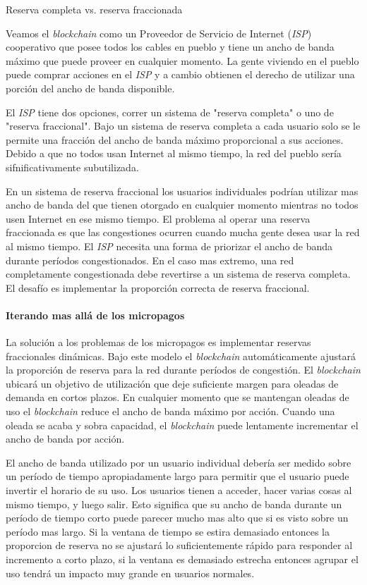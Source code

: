 \documentclass[a4paper,titlepage,final]{article}
\begin{document}
Reserva completa vs. reserva fraccionada

Veamos el \textit{blockchain} como un Proveedor de Servicio de Internet (\textit{ISP}) cooperativo que posee todos los cables en pueblo y tiene un ancho de banda máximo que puede proveer en cualquier momento. La gente viviendo en el pueblo puede comprar acciones en el \textit{ISP} y a cambio obtienen el derecho de utilizar una porción del ancho de banda disponible.

El \textit{ISP} tiene dos opciones, correr un sistema de "reserva completa" o uno de "reserva fraccional". Bajo un sistema de reserva completa a cada usuario solo se le permite una fracción del ancho de banda máximo proporcional a sus acciones. Debido a que no todos usan Internet al mismo tiempo, la red del pueblo sería sifnificativamente subutilizada.

En un sistema de reserva fraccional los usuarios individuales podrían utilizar mas ancho de banda del que tienen otorgado en cualquier momento mientras no todos usen Internet en ese mismo tiempo. El problema al operar una reserva fraccionada es que las congestiones ocurren cuando mucha gente desea usar la red al mismo tiempo. El \textit{ISP} necesita una forma de priorizar el ancho de banda durante períodos congestionados. En el caso mas extremo, una red completamente congestionada debe revertirse a un sistema de reserva completa. El desafío es implementar la proporción correcta de reserva fraccional.

\paragraph{Iterando mas allá de los micropagos}

La solución a los problemas de los micropagos es implementar reservas fraccionales dinámicas. Bajo este modelo el \textit{blockchain} automáticamente ajustará la proporción de reserva para la red durante períodos de congestión. El \textit{blockchain} ubicará un objetivo de utilización que deje suficiente margen para oleadas de demanda en cortos plazos. En cualquier momento que se mantengan oleadas de uso el \textit{blockchain} reduce el ancho de banda máximo por acción. Cuando una oleada se acaba y sobra capacidad, el \textit{blockchain} puede lentamente incrementar el ancho de banda por acción.

El ancho de banda utilizado por un usuario individual debería ser medido sobre un período de tiempo apropiadamente largo para permitir que el usuario puede invertir el horario de su uso. Los usuarios tienen a acceder, hacer varias cosas al mismo tiempo, y luego salir. Esto significa que su ancho de banda durante un período de tiempo corto puede parecer mucho mas alto que si es visto sobre un período mas largo. Si la ventana de tiempo se estira demasiado entonces la proporcion de reserva no se ajustará lo suficientemente rápido para responder al incremento a corto plazo, si la ventana es demasiado estrecha entonces agrupar el uso tendrá un impacto muy grande en usuarios normales.
\end{document}
